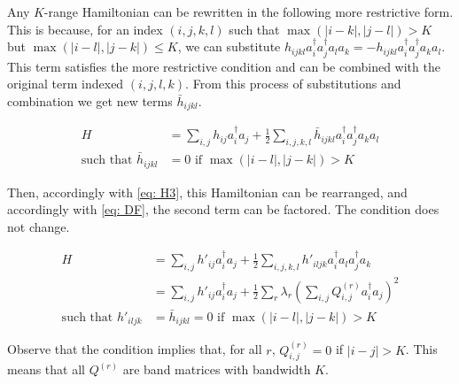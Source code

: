 Any $K$-range Hamiltonian can be rewritten in the following more restrictive form. This is because, for an index $(i, j, k, l)$ such that $\max(|i - k|, |j - l|) > K$ but $\max(|i - l|, |j - k|) \leq K$, we can substitute $h_{ijkl}a^\dag_ia^\dag_ja_la_k = -h_{ijkl}a^\dag_ia^\dag_ja_ka_l$. This term satisfies the more restrictive condition and can be combined with the original term indexed $(i, j, l, k)$. From this process of substitutions and combination we get new terms $\bar{h}_{ijkl}$.

\begin{equation}
    \begin{split}
        H &= \sum_{i, j} h_{ij}a^\dag_ia_j + \frac{1}{2}\sum_{i,j,k,l} \bar{h}_{ijkl}a^\dag_ia^\dag_ja_ka_l \\
        \text{such that } \bar{h}_{ijkl} &= 0 \text{ if } \max(|i - l|, |j - k|) > K
    \end{split}
\end{equation}

Then, accordingly with \eqref{eq: H3}, this Hamiltonian can be rearranged, and accordingly with \eqref{eq: DF}, the second term can be factored. The condition does not change.

\begin{equation}
    \begin{split}
        H &= \sum_{i, j} h'_{ij}a^\dag_ia_j + \frac{1}{2}\sum_{i,j,k,l} h'_{iljk}a^\dag_ia_la^\dag_ja_k \\
        &= \sum_{i, j} h'_{ij}a^\dag_ia_j + \frac{1}{2}\sum_r\lambda_r\left(\sum_{i,j} Q^{(r)}_{i, j}a^\dag_ia_j\right)^2 \\
        \text{such that } h'_{iljk} &= \bar{h}_{ijkl} = 0 \text{ if } \max(|i - l|, |j - k|) > K
    \end{split}
\end{equation}

Observe that the condition implies that, for all $r$, $Q^{(r)}_{i, j} = 0$ if $|i - j| > K$. This means that all $Q^{(r)}$ are band matrices with bandwidth $K$.


